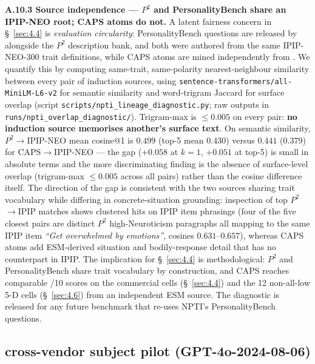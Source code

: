 \label{app:A.10.3}
\textbf{A.10.3 Source independence --- $P^{\!2}$ and PersonalityBench share an IPIP-NEO root; CAPS atoms do not.} A latent fairness concern in \S~\ref{sec:4.4} is \textit{evaluation circularity}: PersonalityBench questions are released by \citet{NPTI} alongside the $P^{\!2}$ description bank, and both were authored from the same IPIP-NEO-300 \cite{ipipneo} trait definitions, while CAPS atoms are mined independently from \citet{beck2022esm}. We quantify this by computing same-trait, same-polarity nearest-neighbour similarity between every pair of induction sources, using \texttt{sentence-\allowbreak{}transformers/\allowbreak{}all-\allowbreak{}MiniLM-\allowbreak{}L6-\allowbreak{}v2} for semantic similarity and word-trigram Jaccard for surface overlap (script \texttt{scripts/\allowbreak{}npti\_\allowbreak{}lineage\_\allowbreak{}diagnostic.py}; raw outputs in \texttt{runs/\allowbreak{}npti\_\allowbreak{}overlap\_\allowbreak{}diagnostic/\allowbreak{}}). Trigram-max is $\leq 0.005$ on every pair: \textbf{no induction source memorises another's surface text}. On semantic similarity, $P^{\!2}$$\rightarrow$IPIP-NEO mean cosine@1 is $0.499$ (top-5 mean $0.430$) versus $0.441$ ($0.379$) for CAPS$\rightarrow$IPIP-NEO --- the gap ($+0.058$ at $k{=}1$, $+0.051$ at top-5) is small in absolute terms and the more discriminating finding is the absence of surface-level overlap (trigram-max $\leq 0.005$ across all pairs) rather than the cosine difference itself. The direction of the gap is consistent with the two sources sharing trait vocabulary while differing in concrete-situation grounding: inspection of top $P^{\!2}$$\rightarrow$IPIP matches shows clustered hits on IPIP item phrasings (four of the five closest pairs are distinct $P^{\!2}$ high-Neuroticism paragraphs all mapping to the same IPIP item \textit{``Get overwhelmed by emotions''}, cosines $0.631$--$0.657$), whereas CAPS atoms add ESM-derived situation and bodily-response detail that has no counterpart in IPIP. The implication for \S~\ref{sec:4.4} is methodological: $P^{\!2}$ and PersonalityBench share trait vocabulary by construction, and CAPS reaches comparable /10 scores on the commercial cells (\S~\ref{sec:4.4}) and the 12 non-all-low 5-D cells (\S~\ref{sec:4.6}) from an independent ESM source. The diagnostic is released for any future benchmark that re-uses NPTI's PersonalityBench questions.

\subsection{cross-vendor subject pilot (GPT-4o-2024-08-06)}
\label{app:A.11}


